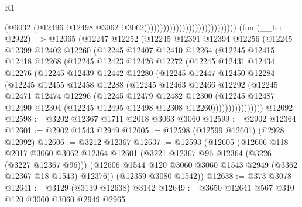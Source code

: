 \begin{lexlean}{R1}
\begin{coremodule}
                                                          (@6032
                                                            (@12496
                                                              @12498
                                                              @3062
                                                              @3062)))))))))))))))))))))))))))))
    (fun (__b : @2922) =>
    @12065
      (@12247
        @12252
        (@12245
          @12391
          @12394
          @12256
          (@12245
            @12399
            @12402
            @12260
            (@12245
              @12407
              @12410
              @12264
              (@12245
                @12415
                @12418
                @12268
                (@12245
                  @12423
                  @12426
                  @12272
                  (@12245
                    @12431
                    @12434
                    @12276
                    (@12245
                      @12439
                      @12442
                      @12280
                      (@12245
                        @12447
                        @12450
                        @12284
                        (@12245
                          @12455
                          @12458
                          @12288
                          (@12245
                            @12463
                            @12466
                            @12292
                            (@12245
                              @12471
                              @12474
                              @12296
                              (@12245
                                @12479
                                @12482
                                @12300
                                (@12245
                                  @12487
                                  @12490
                                  @12304
                                  (@12245 @12495 @12498 @12308 @12260))))))))))))))))
    @12092
@12598 := @3202 @12367 @1711 @2018 @3063 @3060
@12599 := @2902 @12364
@12601 := @2902 @1543 @2949
@12605 := @12598 (@12599 @12601) (@2928 @12092)
@12606 := @3212 @12367
@12637 := @12593
    (@12605
      (@12606
        @118
        @2017
        @3060
        @3062
        @12364
        @12601
        (@3221 @12367 @96 @12364 (@3226 (@3227 @12367 @96)))
        (@12606 @1544 @120 @3060 @3060 @1543 @2949 (@3362 @12367 @18 @1543) @12376))
      (@12359 @3080 @1542))
@12638 := @373 @3078
@12641 := @3129 (@3139 @12638) @3142
@12649 := @3650 @12641 @567 @310 @120 @3060 @3060 @2949 @2965

\end{coremodule}
\end{lexlean}
